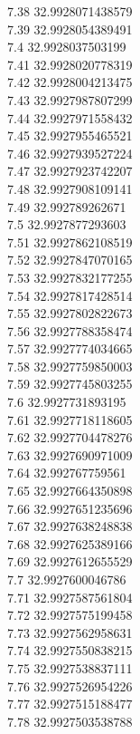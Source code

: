 {7.38	32.9928071438579\\
7.39	32.9928054389491\\
7.4	32.9928037503199\\
7.41	32.9928020778319\\
7.42	32.9928004213475\\
7.43	32.9927987807299\\
7.44	32.9927971558432\\
7.45	32.9927955465521\\
7.46	32.9927939527224\\
7.47	32.9927923742207\\
7.48	32.9927908109141\\
7.49	32.992789262671\\
7.5	32.9927877293603\\
7.51	32.9927862108519\\
7.52	32.9927847070165\\
7.53	32.9927832177255\\
7.54	32.9927817428514\\
7.55	32.9927802822673\\
7.56	32.9927788358474\\
7.57	32.9927774034665\\
7.58	32.9927759850003\\
7.59	32.9927745803255\\
7.6	32.9927731893195\\
7.61	32.9927718118605\\
7.62	32.9927704478276\\
7.63	32.9927690971009\\
7.64	32.992767759561\\
7.65	32.9927664350898\\
7.66	32.9927651235696\\
7.67	32.9927638248838\\
7.68	32.9927625389166\\
7.69	32.9927612655529\\
7.7	32.9927600046786\\
7.71	32.9927587561804\\
7.72	32.9927575199458\\
7.73	32.9927562958631\\
7.74	32.9927550838215\\
7.75	32.9927538837111\\
7.76	32.9927526954226\\
7.77	32.9927515188477\\
7.78	32.9927503538788\\
}

